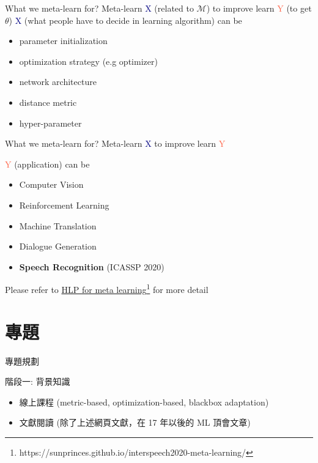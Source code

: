 \documentclass{beamer}
\begin{document}
\begin{frame}[t]{What we meta-learn for?}
  \centering Meta-learn \textcolor{navy}{X} (related to $\mathcal{M}$) to improve learn \textcolor{tomato}{Y} (to get $\theta$)
  \pause
  \flushleft \textcolor{navy}{X} (what people have to decide in learning algorithm) can be
  \begin{itemize}
    \item parameter initialization
    \item optimization strategy (e.g optimizer)
    \item network architecture
    \item distance metric
    \item hyper-parameter
  \end{itemize}
\end{frame}

\begin{frame}[t]{What we meta-learn for?}
  \centering Meta-learn \textcolor{navy}{X} to improve learn \textcolor{tomato}{Y}

  \flushleft \textcolor{tomato}{Y} (application) can be
  \begin{itemize}
    \item Computer Vision
    \item Reinforcement Learning
    \item Machine Translation
    \item Dialogue Generation
    \item \textbf{Speech Recognition} (ICASSP 2020)
  \end{itemize}
  Please refer to \href{https://sunprinces.github.io/interspeech2020-meta-learning/}{HLP for meta learning}\footnote{https://sunprinces.github.io/interspeech2020-meta-learning/} for more detail
\end{frame}


\section{專題}
\begin{frame}[t]{專題規劃}
  \begin{block}{階段一: 背景知識}
    \begin{itemize}
      \item 線上課程 (metric-based, optimization-based, blackbox adaptation)
      \item 文獻閱讀 (除了上述網頁文獻，在 17 年以後的 ML 頂會文章)
    \end{itemize}
  \end{block}
\end{frame}
\end{document}
